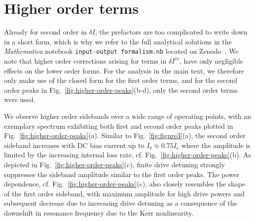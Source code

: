 \section{Higher order terms}\label{app:higher-orders}
% 
Already for second order in $\delta I$, the prefactors are too complicated to write down in a short form, which is why we refer to the full analytical solutions in the \textit{Mathematica} notebook \texttt{input-output formalism.nb} located on Zenodo~\cite{zenodo1}.
% 
We note that higher order corrections arising for terms in $\delta I^m$, have only negligible effects on the lower order forms.
% 
For the analysis in the main text, we therefore only make use of the closed form for the first order terms, and for the second order peaks in Fig.~\ref{fig:higher-order-peaks}(b-d), only the second order terms were used.

We observe higher order sidebands over a wide range of operating points, with an exemplary spectrum exhibiting both first and second order peaks plotted in Fig.~\ref{fig:higher-order-peaks}(a).
% 
Similar to Fig.~\ref{fig:figure3}(a), the second order sideband increases with DC bias current up to $I_b\approx 0.75 I_c$ where the amplitude is limited by the increasing internal loss rate, cf. Fig.~\ref{fig:higher-order-peaks}(b).
%
As depicted in Fig.~\ref{fig:higher-order-peaks}(c), finite drive detuning strongly suppresses the sideband amplitude similar to the first order peaks.
% 
The power dependence, cf. Fig.~\ref{fig:higher-order-peaks}(c), also closely resembles the shape of the first order sideband, with maximum amplitude for high drive powers and subsequent decrease due to increasing drive detuning as a consequence of the downshift in resonance frequency due to the Kerr nonlinearity.

